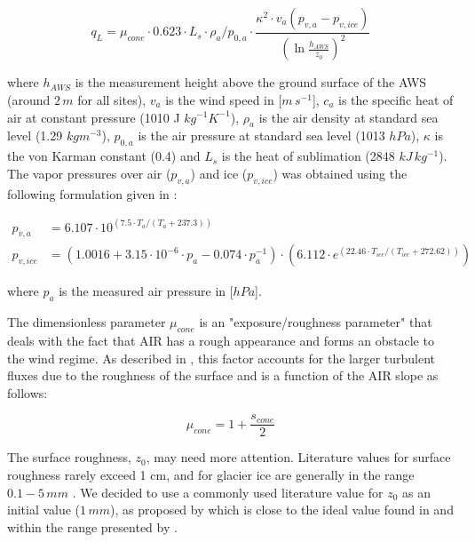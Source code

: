 \documentclass[utf8]{frontiersSCNS} %
\begin{document}
\begin{equation} q_{L}=\mu_{cone}\cdot 0.623 \cdot L_s \cdot \rho_{a}/p_{0,a} \cdot \frac{\kappa^2 \cdot
v_a(p_{v,a}-p_{v,ice})}{{(\ln{\frac{h_{AWS}}{z_{0}}})}^2} \end{equation}

where $h_{AWS}$ is the measurement height above the ground surface of the AWS (around $2\,m$ for all sites), $v_a$ is
the wind speed in [$m\,s^{-1}$], $c_a$ is the specific heat of air at constant pressure (1010 J $kg^{-1} K^{-1}$),
$\rho_{a}$ is the air density at standard sea level (1.29 $kg m^{-3}$), $p_{0,a}$ is the air pressure at standard sea
level (1013 $hPa$), $\kappa$ is the von Karman constant (0.4) and $L_s$ is the heat of sublimation (2848 $kJ\,
kg^{-1}$).  The vapor pressures over air ($p_{v,a}$) and ice ($p_{v,ice}$) was obtained using the following formulation
given in \cite{WMO_2018}:

\begin{equation} \begin{split} p_{v,a}&=6.107 \cdot 10^{(7.5 \cdot T_a / (T_a + 237.3))}\\ p_{v,ice}&=(1.0016 +
3.15\cdot10^{-6}\cdot p_{a}-0.074\cdot p_{a}^{-1})\cdot(6.112 \cdot e^{(22.46 \cdot T_{ice} / (T_{ice} + 272.62))})
\end{split} \label{eqn:vp} \end{equation}

where $p_{a}$ is the measured air pressure in [$hPa$].  

The dimensionless parameter $\mu_{cone}$ is an "exposure/roughness parameter" that deals with the fact that AIR has a
rough appearance and forms an obstacle to the wind regime. As described in \cite{Oerlemans_2021}, this factor accounts
for the larger turbulent fluxes due to the roughness of the surface and is a function of the AIR slope as follows:

\begin{equation}
    \mu_{cone} = 1 + \frac{s_{cone}}{2}
\end{equation}

The surface roughness, $z_{0}$, may need more attention. Literature values for surface roughness rarely exceed 1 cm, and
for glacier ice are generally in the range $0.1-5\, mm$ \cite{BrockWillisSharp_2006}. We decided to use a commonly used
literature value for $z_{0}$ as an initial value ($1\,mm$), as proposed by \cite{pellicciotti_2005} which is close to
the ideal value found in \cite{reid_brock_2014} and within the range presented by \cite{BrockWillisSharp_2006}. 
\end{document}
